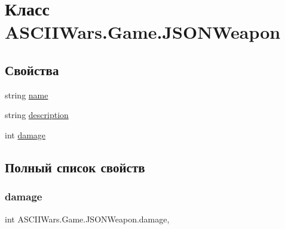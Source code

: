 \hypertarget{class_a_s_c_i_i_wars_1_1_game_1_1_j_s_o_n_weapon}{}\section{Класс A\+S\+C\+I\+I\+Wars.\+Game.\+J\+S\+O\+N\+Weapon}
\label{class_a_s_c_i_i_wars_1_1_game_1_1_j_s_o_n_weapon}
\subsection*{Свойства}
\begin{DoxyCompactItemize}
\item 
string \hyperlink{class_a_s_c_i_i_wars_1_1_game_1_1_j_s_o_n_weapon_a66a5d6b4e9584f26f9b8a966ac98ddc0}{name}
\item 
string \hyperlink{class_a_s_c_i_i_wars_1_1_game_1_1_j_s_o_n_weapon_af8f05b5ec58b19bf2a2d78fade7abd40}{description}
\item 
int \hyperlink{class_a_s_c_i_i_wars_1_1_game_1_1_j_s_o_n_weapon_a83c928f27abae22674b84d6f17d7a07a}{damage}
\end{DoxyCompactItemize}


\subsection{Полный список свойств}
\hypertarget{class_a_s_c_i_i_wars_1_1_game_1_1_j_s_o_n_weapon_a83c928f27abae22674b84d6f17d7a07a}{}\label{class_a_s_c_i_i_wars_1_1_game_1_1_j_s_o_n_weapon_a83c928f27abae22674b84d6f17d7a07a} 
\subsubsection{\texorpdfstring{damage}{damage}}
{\footnotesize\ttfamily int A\+S\+C\+I\+I\+Wars.\+Game.\+J\+S\+O\+N\+Weapon.\+damage\hspace{0.3cm}{\ttfamily [get]}, {\ttfamily [set]}}

